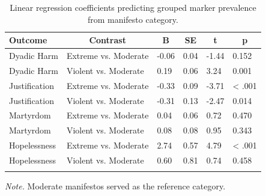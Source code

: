 \documentclass[
  english,
  man,floatsintext]{apa6}
\begin{document}
\begin{table}[tbp]

\begin{center}
\begin{threeparttable}

\caption{\label{tab:marker-group-regressions}Linear regression coefficients predicting grouped marker prevalence from manifesto category.}

\begin{tabular}{llllll}
\toprule
Outcome & \multicolumn{1}{c}{Contrast} & \multicolumn{1}{c}{B} & \multicolumn{1}{c}{SE} & \multicolumn{1}{c}{t} & \multicolumn{1}{c}{p}\\
\midrule
Dyadic Harm & Extreme vs. Moderate & -0.06 & 0.04 & -1.44 & 0.152\\
Dyadic Harm & Violent vs. Moderate & 0.19 & 0.06 & 3.24 & 0.001\\
Justification & Extreme vs. Moderate & -0.33 & 0.09 & -3.71 & < .001\\
Justification & Violent vs. Moderate & -0.31 & 0.13 & -2.47 & 0.014\\
Martyrdom & Extreme vs. Moderate & 0.04 & 0.06 & 0.72 & 0.470\\
Martyrdom & Violent vs. Moderate & 0.08 & 0.08 & 0.95 & 0.343\\
Hopelessness & Extreme vs. Moderate & 2.74 & 0.57 & 4.79 & < .001\\
Hopelessness & Violent vs. Moderate & 0.60 & 0.81 & 0.74 & 0.458\\
\bottomrule
\addlinespace
\end{tabular}

\begin{tablenotes}[para]
\normalsize{\textit{Note.} Moderate manifestos served as the reference category.}
\end{tablenotes}

\end{threeparttable}
\end{center}

\end{table}
\end{document}
